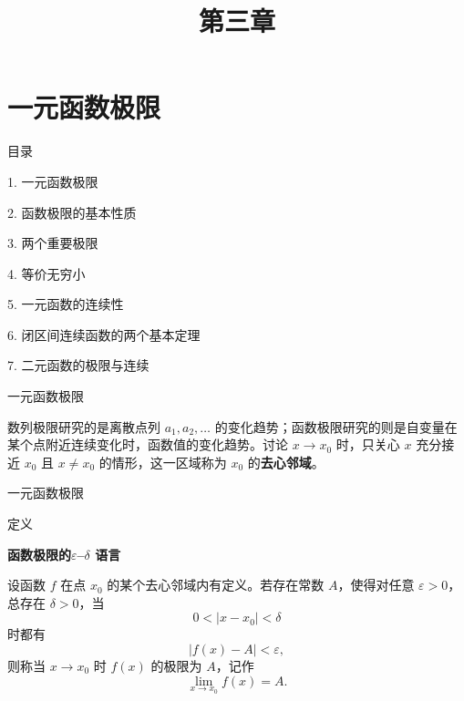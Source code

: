 \documentclass[aspectratio=169,10pt,fontset=fandol]{ctexbeamer}
\title{第三章}
\begin{document}
\section{一元函数极限}
\begin{frame}[t,fragile]{目录}
\normalsize
{\color{blue}\normalsize 1. 一元函数极限\par}\vspace{0.3em}
{\color{gray!40}\normalsize 2. 函数极限的基本性质\par}\vspace{0.3em}
{\color{gray!40}\normalsize 3. 两个重要极限\par}\vspace{0.3em}
{\color{gray!40}\normalsize 4. 等价无穷小\par}\vspace{0.3em}
{\color{gray!40}\normalsize 5. 一元函数的连续性\par}\vspace{0.3em}
{\color{gray!40}\normalsize 6. 闭区间连续函数的两个基本定理\par}\vspace{0.3em}
{\color{gray!40}\normalsize 7. 二元函数的极限与连续\par}\vspace{0.3em}
\end{frame}
\begin{frame}[t,fragile]{一元函数极限}
\footnotesize
{\footnotesize
数列极限研究的是离散点列 \(a_1,a_2,\ldots\) 的变化趋势；函数极限研究的则是自变量在某个点附近连续变化时，函数值的变化趋势。讨论 \(x\to x_0\) 时，只关心 \(x\) 充分接近 \(x_0\) 且 \(x\neq x_0\) 的情形，这一区域称为 \(x_0\) 的\textbf{去心邻域}。


}
\end{frame}
\begin{frame}[t,fragile]{一元函数极限}
\footnotesize
\begin{block}{定义}
{\footnotesize
\textbf{函数极限的\(\varepsilon\)--\(\delta\) 语言}\par

设函数 \(f\) 在点 \(x_0\) 的某个去心邻域内有定义。若存在常数 \(A\)，使得对任意 \(\varepsilon>0\)，总存在 \(\delta>0\)，当
\[
0<|x-x_0|<\delta
\]
时都有
\[
|f(x)-A|<\varepsilon,
\]
则称当 \(x\to x_0\) 时 \(f(x)\) 的极限为 \(A\)，记作
\[
\lim_{x\to x_0}f(x)=A.
\]

}
\end{block}
\end{frame}
\end{document}
